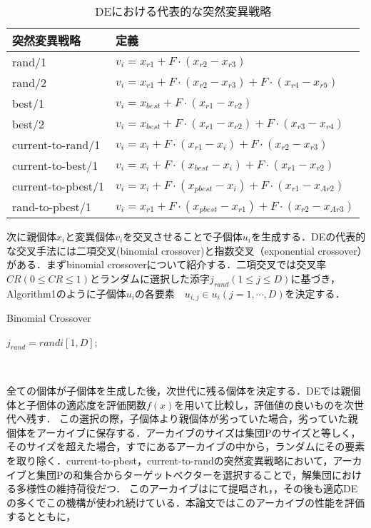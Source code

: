\documentclass[a4paper,11pt,oneside,openany]{jsbook}
\begin{document}
\begin{table}[htb]
  \begin{center}
    \begin{tabular}{ll} \hline
      突然変異戦略　& 定義  \\ \hline
      rand/1 & $v_{i} = x_{r1} + F\cdot(x_{r2} - x_{r3})$ \\
      rand/2 & $v_{i} = x_{r1} + F\cdot(x_{r2} - x_{r3}) + F\cdot(x_{r4} - x_{r5})$ \\
      best/1 & $v_{i} = x_{best} + F\cdot(x_{r1} - x_{r2})$ \\
      best/2 & $v_{i} = x_{best} + F\cdot(x_{r1} - x_{r2}) + F\cdot(x_{r3} - x_{r4})$ \\
      current-to-rand/1 & $v_{i} = x_{i} + F\cdot(x_{r1} - x_{i}) + F\cdot(x_{r2} - x_{r3})$ \\
      current-to-best/1 & $v_{i} = x_{i} + F\cdot(x_{best} - x_{i}) + F\cdot(x_{r1} - x_{r2})$ \\
      current-to-pbest/1 & $v_{i} = x_{i} + F\cdot(x_{pbest} - x_{i}) + F\cdot(x_{r1} - x_{Ar2})$ \\
      rand-to-pbest/1 & $v_{i} = x_{r1} + F\cdot(x_{pbest} - x_{r1}) + F\cdot(x_{r2} - x_{Ar3})$ \\ \hline
    \end{tabular}
    \caption{DEにおける代表的な突然変異戦略}
  \end{center}
\end{table}


次に親個体$x_i$と変異個体$v_i$を交叉させることで子個体$u_i$を生成する．DEの代表的な交叉手法には二項交叉(binomial crossover)と指数交叉（exponential crossover）がある．まずbinomial crossoverについて紹介する．二項交叉では交叉率$CR(0 \leq CR \leq 1)$とランダムに選択した添字$j_{rand}(1 \leq j \leq D)$に基づき，Algorithm1のように子個体$u_i$の各要素　$u_{i,j} \in u_{i}(j = 1, \cdots, D)$を決定する．

\begin{algorithm}                      
\caption{Binomial Crossover}         
\label{alg:pbnf}                          
\begin{algorithmic}  
\STATE $j_{rand} = randi[1, D]$;
  \IF {$rand[0,1)　\leq CR　|| j == j_{rand} $}
  \ELSE
  \ENDIF
\ENDFOR
\end{algorithmic}
\end{algorithm}　

全ての個体が子個体を生成した後，次世代に残る個体を決定する．DEでは親個体と子個体の適応度を評価関数$f(x)$を用いて比較し，評価値の良いものを次世代へ残す．
この選択の際，子個体より親個体が劣っていた場合，劣っていた親個体をアーカイブに保存する．アーカイブのサイズは集団Pのサイズと等しく，そのサイズを超えた場合，すでにあるアーカイブの中から，ランダムにその要素を取り除く．current-to-pbest，current-to-randの突然変異戦略において，アーカイブと集団Pの和集合からターゲットベクターを選択することで，解集団における多様性の維持荷役だつ．
このアーカイブは\cite{JADE}にて提唱され，，その後も適応DEの多くでこの機構が使われ続けている．本論文ではこのアーカイブの性能を評価するとともに，
\end{document}
